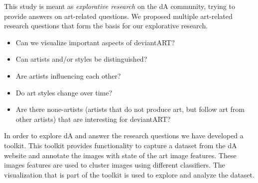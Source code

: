 This study is meant as \textit{explorative research} on the dA community, trying to provide answers on art-related questions.
We proposed multiple art-related research questions that form the basis for our explorative research.
\begin{itemize}
\item Can we visualize important aspects of deviantART?
\item Can artists and/or styles be distinguished?
\item Are artists influencing each other?
\item Do art styles change over time?
\item Are there none-artists (artists that do not produce art, but follow art from other artists) that are interesting for deviantART?
\end{itemize}

In order to explore dA and answer the research questions we have developed a toolkit.
This toolkit provides functionality to capture a dataset from the dA website and annotate the images with state of the art image features.
These images features are used to cluster images using different classifiers.
The visualization that is part of the toolkit is used to explore and analyze the dataset.